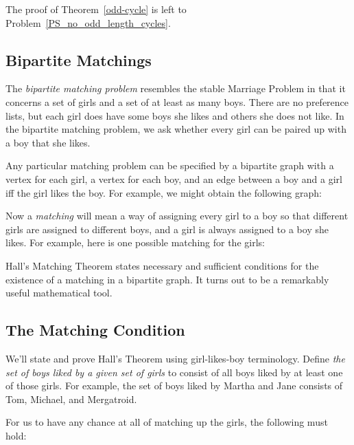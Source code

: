 The proof of Theorem~\ref{odd-cycle} is left to
Problem~\ref{PS_no_odd_length_cycles}.

\subsection{Bipartite Matchings}

The \emph{bipartite matching problem} resembles the stable Marriage
Problem in that it concerns a set of girls and a set of at least as many
boys.  There are no preference lists, but each girl does have some boys
she likes and others she does not like.  In the bipartite matching
problem, we ask whether every girl can be paired up with a boy that she
likes.

Any particular matching problem can be specified by a bipartite graph with
a vertex for each girl, a vertex for each boy, and an edge between a boy
and a girl iff the girl likes the boy.  For example, we might obtain the
following graph:


Now a \emph{matching} will mean a way of assigning every girl to a boy so
that different girls are assigned to different boys, and a girl is always
assigned to a boy she likes.  For example, here is one possible matching
for the girls:


Hall's Matching Theorem states necessary and sufficient conditions for the
existence of a matching in a bipartite graph.  It turns out to be a
remarkably useful mathematical tool.  

\subsection{The Matching Condition}

We'll state and prove Hall's Theorem using girl-likes-boy terminology.
Define {\em the set of boys liked by a given set of girls} to consist of
all boys liked by at least one of those girls.  For example, the set of
boys liked by Martha and Jane consists of Tom, Michael, and Mergatroid.

For us to have any chance at all of matching up the girls, the
following  must hold:

